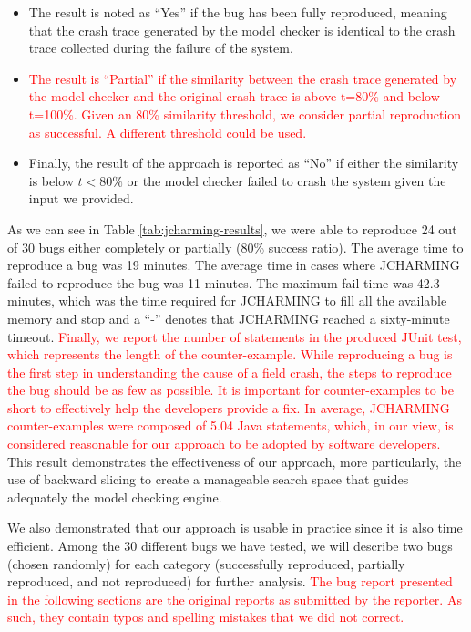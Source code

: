 \documentclass[times, doublespace]{smrauth}
\newcommand{\red}[1]{\textcolor{red}{#1}}
\begin{document}
{\begin{itemize}
  \item The result is noted as ``Yes'' if the bug has been fully
reproduced, meaning that the crash trace generated by the
model checker is identical to the crash trace collected
during the failure of the system.
\item \red{The result is ``Partial'' if the similarity between the crash
trace generated by the model checker and the original
crash trace is above t=80\% and below t=100\%. Given an 80\% similarity
threshold, we consider partial reproduction as successful.
A different threshold could be used.}
\item Finally, the result of the approach is reported as ``No'' if
either the similarity is below $t < 80\%$ or the model
checker failed to crash the system given the input we
provided.
\end{itemize}


As we can see in Table \ref{tab:jcharming-results}, we were able to reproduce 24  out of 30 bugs either completely or partially (80\% success ratio). The average time to reproduce a bug was 19 minutes. The average time in cases where JCHARMING failed to reproduce the bug  was 11 minutes. The maximum fail time was 42.3 minutes, which was the time
required for JCHARMING to fill all the available memory and stop and a ``-'' denotes that JCHARMING reached a sixty-minute timeout.
\red{Finally, we report the number of statements in the produced JUnit test, which represents the length of the counter-example.
While reproducing a bug is the first step in understanding the cause of a field crash, the steps to reproduce the bug should be as few as possible.
It is important for counter-examples to be short to effectively help the developers provide a fix.
In average, JCHARMING counter-examples were composed of 5.04 Java statements, which, in our view, is considered reasonable for our approach to be adopted by software developers.
}
This result demonstrates the effectiveness of our approach,
more particularly, the use of backward slicing to create a
manageable search space that guides adequately the model
checking engine.} We also demonstrated that our approach is usable
in practice since it is also time efficient. Among the 30 different bugs we have tested, we will describe
two bugs (chosen randomly) for each category (successfully
reproduced, partially reproduced, and not reproduced) for
further analysis.
\red{The bug report presented in the following sections are the original reports as submitted by the reporter.
As such, they contain typos and spelling mistakes that we did not correct.}
\end{document}
